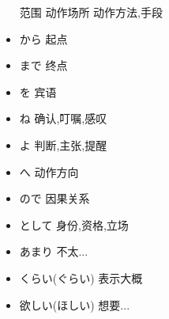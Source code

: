 \begin{itemize}
                范围
                动作场所
                动作方法,手段
        \item から
                起点
        \item まで
                终点
        \item を
                宾语
        \item ね
                确认,叮嘱,感叹
        \item よ
                判断,主张,提醒
        \item へ
                动作方向
        \item ので
                因果关系
        \item として
                身份,资格,立场
        \item あまり
                不太...
        \item くらい(ぐらい)
                表示大概
        \item 欲しい(ほしい)
                想要...
    \end{itemize}

